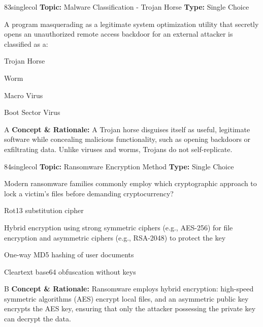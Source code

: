 \begin{qcard}{83}{singlecol}
\textcolor{darkslate!75}{\small\textbf{Topic:} Malware Classification - Trojan Horse \hfill \textbf{Type:} Single Choice}\vspace{0.4em}\par
A program masquerading as a legitimate system optimization utility that secretly opens an unauthorized remote access backdoor for an external attacker is classified as a:
\begin{qoptions}
\item Trojan Horse
\item Worm
\item Macro Virus
\item Boot Sector Virus
\end{qoptions}
\end{qcard}
\nopagebreak
\begin{explainbox}{A}
\textbf{Concept \& Rationale:} A Trojan horse disguises itself as useful, legitimate software while concealing malicious functionality, such as opening backdoors or exfiltrating data. Unlike viruses and worms, Trojans do not self-replicate.
\end{explainbox}

\begin{qcard}{84}{singlecol}
\textcolor{darkslate!75}{\small\textbf{Topic:} Ransomware Encryption Method \hfill \textbf{Type:} Single Choice}\vspace{0.4em}\par
Modern ransomware families commonly employ which cryptographic approach to lock a victim's files before demanding cryptocurrency?
\begin{qoptions}
\item Rot13 substitution cipher
\item Hybrid encryption using strong symmetric ciphers (e.g., AES-256) for file encryption and asymmetric ciphers (e.g., RSA-2048) to protect the key
\item One-way MD5 hashing of user documents
\item Cleartext base64 obfuscation without keys
\end{qoptions}
\end{qcard}
\nopagebreak
\begin{explainbox}{B}
\textbf{Concept \& Rationale:} Ransomware employs hybrid encryption: high-speed symmetric algorithms (AES) encrypt local files, and an asymmetric public key encrypts the AES key, ensuring that only the attacker possessing the private key can decrypt the data.
\end{explainbox}

